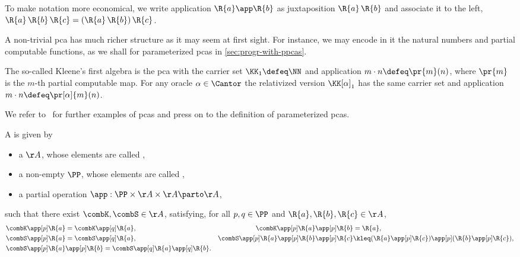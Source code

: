 \noindent
To make notation more economical, we write application $\R{a} \app \R{b}$ as juxtaposition $\R{a} \, \R{b}$ and associate it to the left, $\R{a} \, \R{b} \, \R{c} = (\R{a} \, \R{b}) \, \R{c}$.

A non-trivial pca has much richer structure as it may seem at first sight.
%
For instance, we may encode in it the natural numbers and partial computable functions, as we shall for parameterized pcas in \cref{sec:progr-with-ppcas}.

\begin{example}
  \label{ex:pca-K-1}%
  The so-called Kleene's first algebra is the pca with the carrier set $\KK_1 \defeq \NN$ and application $m \cdot n \defeq \pr{m}(n)$, where $\pr{m}$ is the $m$-th partial computable map.
  For any oracle $\alpha \in \Cantor$ the relativized version $\KK[\alpha]_1$ has the same carrier set and application $m \cdot n \defeq \pr[\alpha]{m}(n)$.
\end{example}

We refer to~\cite{oosten08:_realiz} for further examples of pcas and press on to the definition of parameterized pcas.

\begin{definition}
  \label{def:ppca}%
  A  is given by
  \begin{itemize}
  \item a  $\AA$, whose elements are called ,
  \item a non-empty  $\PP$, whose elements are called ,
  \item a partial  operation ${\app} : \PP \times \AA \times \AA \parto \AA$,
  \end{itemize}
  such that there exist  $\combK, \combS \in \AA$, satisfying, for all $p, q \in \PP$ and $\R{a}, \R{b}, \R{c} \in \AA$,
  \begin{align*}
    &\combK \app[p] \R{a} = \combK \app[q] \R{a},
    &
    \combK \app[p] \R{a} \app[p] \R{b} &= \R{a},
    \\
    &\combS \app[p] \R{a} = \combS \app[q] \R{a},
    &
    \combS \app[p] \R{a} \app[p] \R{b} \app[p] \R{c} &\kleq (\R{a} \app[p] \R{c}) \app[p] (\R{b} \app[p] \R{c}),
    \\
    &\combS \app[p] \R{a} \app[p] \R{b} = \combS \app[q] \R{a} \app[q] \R{b}.
  \end{align*}
\end{definition}

